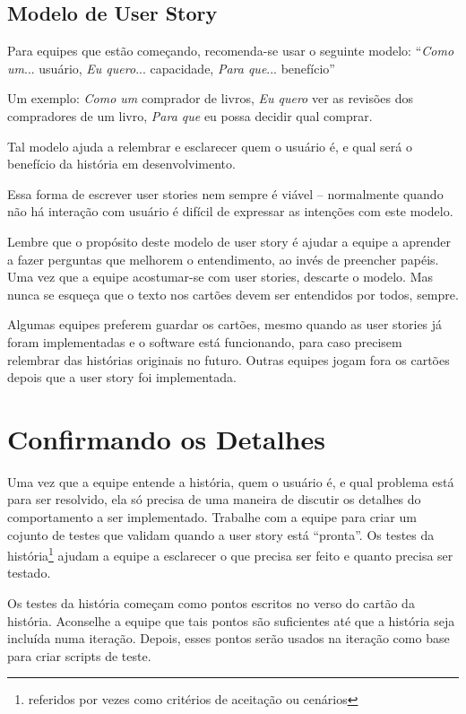 \documentclass[a4paper, 10pt, font=plain]{abnt}
\begin{document}
\subsection{Modelo de User Story}
Para equipes que estão começando, recomenda-se usar o seguinte modelo:
``\textit{Como um}... usuário, \textit{Eu quero}... capacidade, \textit{Para que}... benefício''

Um exemplo: \textit{Como um} comprador de livros, \textit{Eu quero} ver as revisões dos compradores de um livro, \textit{Para que} eu possa decidir qual comprar.

Tal modelo ajuda a relembrar e esclarecer quem o usuário é, e qual será o benefício da história em desenvolvimento.

Essa forma de escrever user stories nem sempre é viável -- normalmente quando não há interação com usuário é difícil de expressar as intenções com este modelo.

Lembre que o propósito deste modelo de user story é ajudar a equipe a aprender a fazer perguntas que melhorem o entendimento, ao invés de preencher papéis. Uma vez que a equipe acostumar-se com user stories, descarte o modelo. Mas nunca se esqueça que o texto nos cartões devem ser entendidos por todos, sempre.

Algumas equipes preferem guardar os cartões, mesmo quando as user stories já foram implementadas e o software está funcionando, para caso precisem relembrar das histórias originais no futuro. Outras equipes jogam fora os cartões depois que a user story foi implementada.



\section{Confirmando os Detalhes}
Uma vez que a equipe entende a história, quem o usuário é, e qual problema está para ser resolvido, ela só precisa de uma maneira de discutir os detalhes do comportamento a ser implementado. Trabalhe com a equipe para criar um cojunto de testes que validam quando a user story está ``pronta''. Os testes da história\footnote{referidos por vezes como critérios de aceitação ou cenários} ajudam a equipe a esclarecer o que precisa ser feito e quanto precisa ser testado.

Os testes da história começam como pontos escritos no verso do cartão da história. Aconselhe a equipe que tais pontos são suficientes até que a história seja incluída numa iteração. Depois, esses pontos serão usados na iteração como base para criar scripts de teste.
\end{document}
